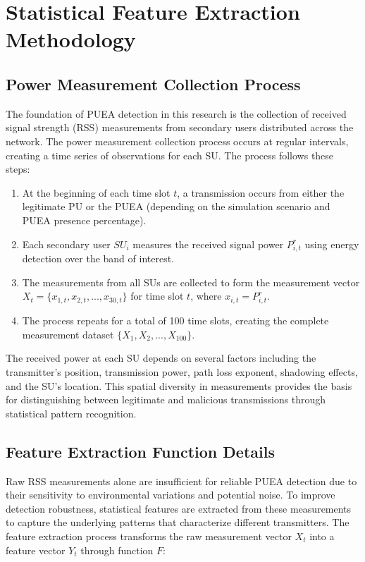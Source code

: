 \chapter{Statistical Feature Extraction Methodology}

\section{Power Measurement Collection Process}

The foundation of PUEA detection in this research is the collection of received signal strength (RSS) measurements from secondary users distributed across the network. The power measurement collection process occurs at regular intervals, creating a time series of observations for each SU. The process follows these steps:

\begin{enumerate}
    \item At the beginning of each time slot $t$, a transmission occurs from either the legitimate PU or the PUEA (depending on the simulation scenario and PUEA presence percentage).
    
    \item Each secondary user $SU_i$ measures the received signal power $P_{i,t}^r$ using energy detection over the band of interest.
    
    \item The measurements from all SUs are collected to form the measurement vector $X_t = \{x_{1,t}, x_{2,t}, ..., x_{30,t}\}$ for time slot $t$, where $x_{i,t} = P_{i,t}^r$.
    
    \item The process repeats for a total of 100 time slots, creating the complete measurement dataset $\{X_1, X_2, ..., X_{100}\}$.
\end{enumerate}

The received power at each SU depends on several factors including the transmitter's position, transmission power, path loss exponent, shadowing effects, and the SU's location. This spatial diversity in measurements provides the basis for distinguishing between legitimate and malicious transmissions through statistical pattern recognition.

\section{Feature Extraction Function Details}

Raw RSS measurements alone are insufficient for reliable PUEA detection due to their sensitivity to environmental variations and potential noise. To improve detection robustness, statistical features are extracted from these measurements to capture the underlying patterns that characterize different transmitters. The feature extraction process transforms the raw measurement vector $X_t$ into a feature vector $Y_t$ through function $F$:

